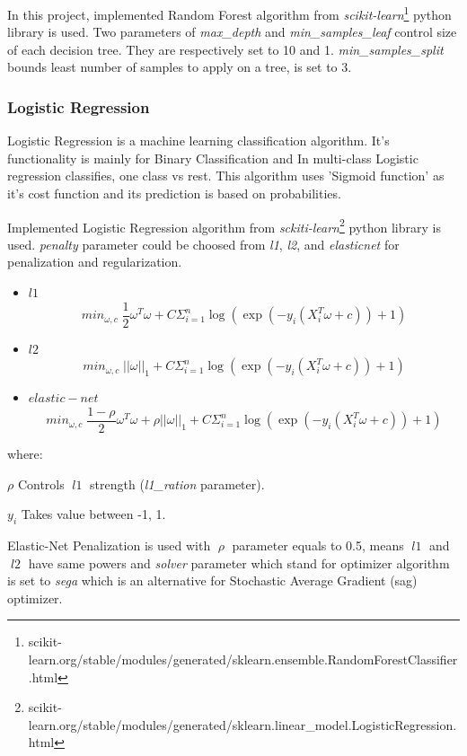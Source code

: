 In this project, implemented Random Forest algorithm from \textit{scikit-learn}\footnote{scikit-learn.org/stable/modules/generated/sklearn.ensemble.RandomForestClassifier.html} python library is used. Two parameters of \textit{max\_depth} and \textit{min\_samples\_leaf} control size of each decision tree. They are respectively set to 10 and 1. \textit{min\_samples\_split} bounds least number of samples to apply on a tree, is set to 3. 

\subsubsection{Logistic Regression}
Logistic Regression is a machine learning classification algorithm. It's functionality is mainly for Binary Classification and In multi-class Logistic regression classifies, one class vs rest. This algorithm uses 'Sigmoid function' as it's cost function and its prediction is based on probabilities. 

Implemented Logistic Regression algorithm from \textit{sckiti-learn}\footnote{scikit-learn.org/stable/modules/generated/sklearn.linear\_model.LogisticRegression.html} python library is used. \textit{penalty} parameter could be choosed from \textit{l1}, \textit{l2}, and \textit{elasticnet} for penalization and regularization.
\begin{itemize}
	\item $l1$
		\[ min_{\omega,c} \; \frac{1}{2}\omega^{T}\omega + C \Sigma_{i=1}^{n} \log\left(\exp\left(-y_{i}\left(X^{T}_{i}\omega + c \right)\right) + 1 \right) \]
	\item $l2$
		\[ min_{\omega,c} \; \left|\left|\omega\right|\right|_{1} + C \Sigma_{i=1}^{n} \log\left(\exp\left(-y_{i}\left(X^{T}_{i}\omega + c \right)\right) + 1 \right) \]
	\item $elastic-net$
		\[ min_{\omega,c} \; \frac{1-\rho}{2}\omega^{T}\omega +\rho\left|\left|\omega\right|\right|_{1} + C \Sigma_{i=1}^{n} \log\left(\exp\left(-y_{i}\left(X^{T}_{i}\omega + c \right)\right) + 1 \right) \]
\end{itemize}
where:
\begin{eqexpl}[25mm]
	\item{$\rho$} Controls $\; l1 \;$ strength (\textit{l1\_ration} parameter).
	\item{$y_{i}$} Takes value between -1, 1.
\end{eqexpl}
\bigbreak
Elastic-Net Penalization is used with $\; \rho \;$ parameter equals to 0.5, means $\;l1\;$ and $\;l2\;$ have same powers and \textit{solver} parameter which stand for optimizer algorithm is set to \textit{sega} which is an alternative for Stochastic Average Gradient (sag) optimizer. 

